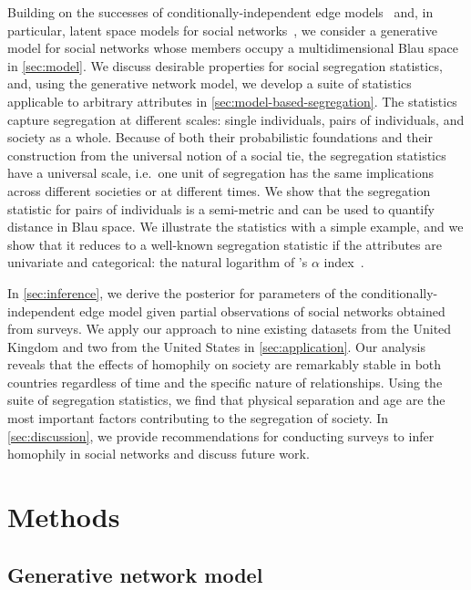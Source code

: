 \documentclass{scrartcl}
\begin{document}
Building on the successes of conditionally-independent edge models~\cite{Snijders2011} and, in particular, latent space models for social networks~\cite{Hoff2002,Handcock2007,Raftery2012}, we consider a generative model for social networks whose members occupy a multidimensional Blau space in \cref{sec:model}. We discuss desirable properties for social segregation statistics, and, using the generative network model, we develop a suite of statistics applicable to arbitrary attributes in \cref{sec:model-based-segregation}. The statistics capture segregation at different scales: single individuals, pairs of individuals, and society as a whole. Because of both their probabilistic foundations and their construction from the universal notion of a social tie, the segregation statistics have a universal scale, i.e.\ one unit of segregation has the same implications across different societies or at different times. We show that the segregation statistic for pairs of individuals is a semi-metric and can be used to quantify distance in Blau space. We illustrate the statistics with a simple example, and we show that it reduces to a well-known segregation statistic if the attributes are univariate and categorical: the natural logarithm of \citeauthor{Moody2001}'s $\alpha$ index~\cite{Moody2001}.

In \cref{sec:inference}, we derive the posterior for parameters of the conditionally-independent edge model given partial observations of social networks obtained from surveys. We apply our approach to nine existing datasets from the United Kingdom and two from the United States in \cref{sec:application}. Our analysis reveals that the effects of homophily on society are remarkably stable in both countries regardless of time and the specific nature of relationships. Using the suite of segregation statistics, we find that physical separation and age are the most important factors contributing to the segregation of society. In \cref{sec:discussion}, we provide recommendations for conducting surveys to infer homophily in social networks and discuss future work.

\section{Methods}

\subsection{Generative network model\label{sec:model}}
\end{document}
